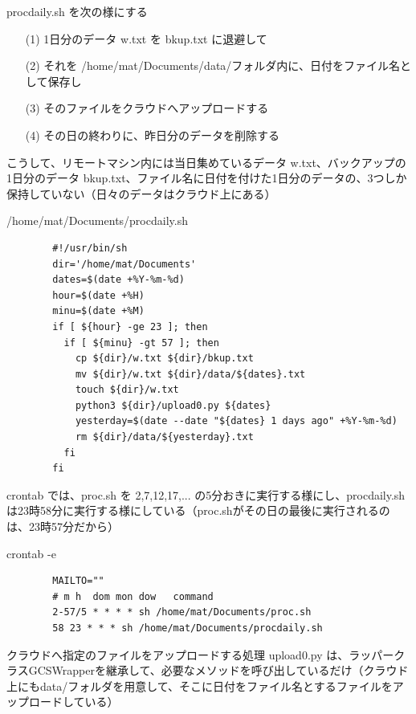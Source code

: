 \documentclass[12pt,a4paper,uplatex]{jsbook}
\begin{document}
procdaily.sh を次の様にする

\begin{enumerate}
\item[(1)] 1日分のデータ w.txt を bkup.txt に退避して
\item[(2)] それを /home/mat/Documents/data/フォルダ内に、日付をファイル名として保存し
\item[(3)] そのファイルをクラウドへアップロードする
\item[(4)] その日の終わりに、昨日分のデータを削除する
\end{enumerate}

こうして、リモートマシン内には当日集めているデータ w.txt、バックアップの1日分のデータ bkup.txt、ファイル名に日付を付けた1日分のデータの、3つしか保持していない（日々のデータはクラウド上にある）

\begin{itembox}[l]{/home/mat/Documents/procdaily.sh}
	\begin{verbatim}
		#!/usr/bin/sh
		dir='/home/mat/Documents'
		dates=$(date +%Y-%m-%d)
		hour=$(date +%H)
		minu=$(date +%M)
		if [ ${hour} -ge 23 ]; then
		  if [ ${minu} -gt 57 ]; then
		    cp ${dir}/w.txt ${dir}/bkup.txt
		    mv ${dir}/w.txt ${dir}/data/${dates}.txt
		    touch ${dir}/w.txt
		    python3 ${dir}/upload0.py ${dates}
		    yesterday=$(date --date "${dates} 1 days ago" +%Y-%m-%d)
		    rm ${dir}/data/${yesterday}.txt
		  fi
		fi
	\end{verbatim}
\end{itembox}

crontab では、proc.sh を 2,7,12,17,... の5分おきに実行する様にし、procdaily.sh は23時58分に実行する様にしている（proc.shがその日の最後に実行されるのは、23時57分だから）

\begin{itembox}[l]{crontab -e}
	\begin{verbatim}
		MAILTO=""
		# m h  dom mon dow   command
		2-57/5 * * * * sh /home/mat/Documents/proc.sh
		58 23 * * * sh /home/mat/Documents/procdaily.sh
	\end{verbatim}	
\end{itembox}

クラウドへ指定のファイルをアップロードする処理 upload0.py は、ラッパークラスGCSWrapperを継承して、必要なメソッドを呼び出しているだけ（クラウド上にもdata/フォルダを用意して、そこに日付をファイル名とするファイルをアップロードしている）
\end{document}
